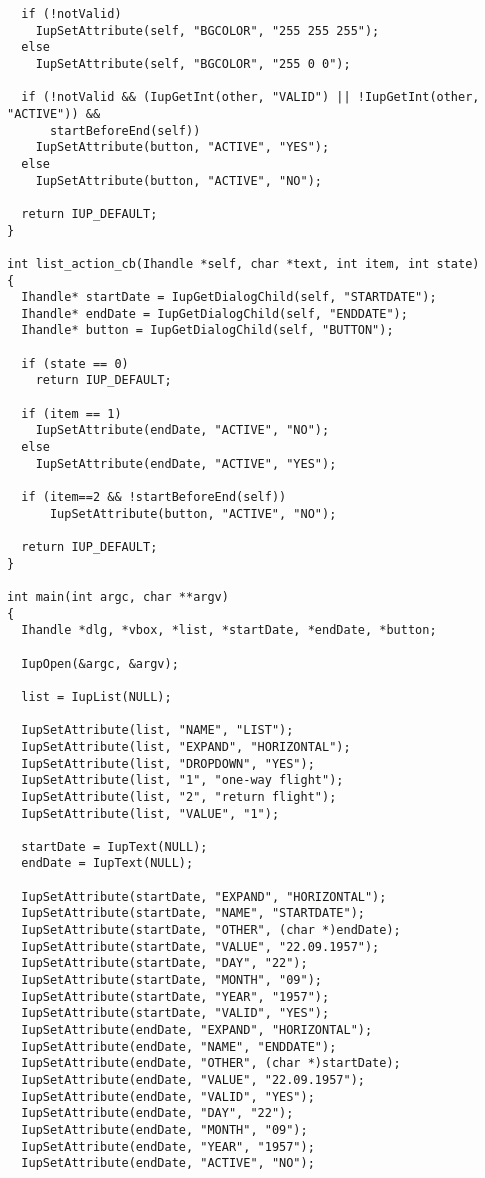 \documentclass{ctexart}
\begin{document}
\begin{lstlisting}
  if (!notValid)
    IupSetAttribute(self, "BGCOLOR", "255 255 255");
  else
    IupSetAttribute(self, "BGCOLOR", "255 0 0");

  if (!notValid && (IupGetInt(other, "VALID") || !IupGetInt(other, "ACTIVE")) &&
      startBeforeEnd(self))
    IupSetAttribute(button, "ACTIVE", "YES");
  else
    IupSetAttribute(button, "ACTIVE", "NO");

  return IUP_DEFAULT;
}

int list_action_cb(Ihandle *self, char *text, int item, int state)
{
  Ihandle* startDate = IupGetDialogChild(self, "STARTDATE");
  Ihandle* endDate = IupGetDialogChild(self, "ENDDATE");
  Ihandle* button = IupGetDialogChild(self, "BUTTON");

  if (state == 0)
    return IUP_DEFAULT;

  if (item == 1)
    IupSetAttribute(endDate, "ACTIVE", "NO");
  else
    IupSetAttribute(endDate, "ACTIVE", "YES");

  if (item==2 && !startBeforeEnd(self))
      IupSetAttribute(button, "ACTIVE", "NO");

  return IUP_DEFAULT;
}

int main(int argc, char **argv)
{
  Ihandle *dlg, *vbox, *list, *startDate, *endDate, *button;

  IupOpen(&argc, &argv);

  list = IupList(NULL);

  IupSetAttribute(list, "NAME", "LIST");
  IupSetAttribute(list, "EXPAND", "HORIZONTAL");
  IupSetAttribute(list, "DROPDOWN", "YES");
  IupSetAttribute(list, "1", "one-way flight");
  IupSetAttribute(list, "2", "return flight");
  IupSetAttribute(list, "VALUE", "1");

  startDate = IupText(NULL);
  endDate = IupText(NULL);

  IupSetAttribute(startDate, "EXPAND", "HORIZONTAL");
  IupSetAttribute(startDate, "NAME", "STARTDATE");
  IupSetAttribute(startDate, "OTHER", (char *)endDate);
  IupSetAttribute(startDate, "VALUE", "22.09.1957");
  IupSetAttribute(startDate, "DAY", "22");
  IupSetAttribute(startDate, "MONTH", "09");
  IupSetAttribute(startDate, "YEAR", "1957");
  IupSetAttribute(startDate, "VALID", "YES");
  IupSetAttribute(endDate, "EXPAND", "HORIZONTAL");
  IupSetAttribute(endDate, "NAME", "ENDDATE");
  IupSetAttribute(endDate, "OTHER", (char *)startDate);
  IupSetAttribute(endDate, "VALUE", "22.09.1957");
  IupSetAttribute(endDate, "VALID", "YES");
  IupSetAttribute(endDate, "DAY", "22");
  IupSetAttribute(endDate, "MONTH", "09");
  IupSetAttribute(endDate, "YEAR", "1957");
  IupSetAttribute(endDate, "ACTIVE", "NO");


\end{lstlisting}
\end{document}
